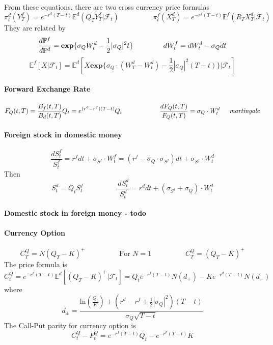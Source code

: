 \documentclass[a4paper,10pt]{article}
\begin{document}
From these equations, there are two cross currency price formulas
\[
\pi^d_t(Y^f_T) = e^{-r^d(T-t)}\mathbb{E}^d(Q_T Y^f_T|\mathcal{F}_t)
\hspace{2cm}
\pi^f_t(X^d_T) = e^{-r^f(T-t)}\mathbb{E}^f(R_T X^d_T|\mathcal{F}_t)
\]
They are related by
\[
\frac{d\mathbb{P}^f}{d\mathbb{P}^d}=\textbf{exp}\{\sigma_{Q}W^d_t - \frac{1}{2} |\sigma_{Q}|^2 t \}
\hspace{1.5cm}
dW^f_t = dW^d_t - \sigma_{Q}dt  
\]
\[
\mathbb{E}^f[X|\mathcal{F}_t] = \mathbb{E}^d[X\textbf{exp}\{ \sigma_{Q}\cdot(W^d_T - W^d_t) -\frac{1}{2} |\sigma_{Q}|^2(T-t) \} |\mathcal{F}_t]
\]
\paragraph{Forward Exchange Rate}
\[
F_{Q}(t,T) = \frac{B_f(t,T)}{B_d(t,T)}Q_t = e^{(r^d - r^f)(T-t)}Q_t
\hspace{2cm}
\frac{d F_{Q}(t,T)}{F_{Q}(t,T)}= \sigma_{Q}\cdot W^d_t
\hspace{0.5cm}\textit{martingale}
\]
\paragraph{Foreign stock in domestic money}
\[
\frac{dS^f_t}{S^f_t} = r^f dt + \sigma_{S^f}\cdot W^f_t = (r^f - \sigma_{Q}\cdot\sigma_{S^f})dt + \sigma_{S^f}\cdot W^d_t
\]
Then
\[
S^d_t = Q_t S^f_t
\hspace{2cm}
\frac{dS^d_t}{S^d_t} = r^d dt + (\sigma_{S^f} + \sigma_{Q})\cdot W^d_t 
\]
\paragraph{Domestic stock in foreign money - todo}

\paragraph{Currency Option}
\[
C^{Q}_T = N(Q_T -K)^+
\hspace{2cm}\text{For }N=1\hspace{2cm}
C^{Q}_T = (Q_T -K)^+
\]
The price formula is
\[
C^{Q}_t = e^{-r^d(T-t)}\mathbb{E}^d[ (Q_T - K)^+|\mathcal{F}_t ] = Q_t e^{-r^f(T-t)}N(d_{+}) - K e^{-r^d(T-t)}N(d_{-})
\]
where
\[
d_{\pm} = \frac{ \text{ln}(\frac{Q_t}{K}) + (r^d-r^f \pm \frac{1}{2}|\sigma_{Q}|^2)(T-t) }{\sigma_{Q}\sqrt{T-t}}
\]
The Call-Put parity for currency option is
\[
C^{Q}_t - P^{Q}_t = e^{-r^f(T-t)} Q_t  - e^{-r^d(T-t)} K   
\]
\end{document}
